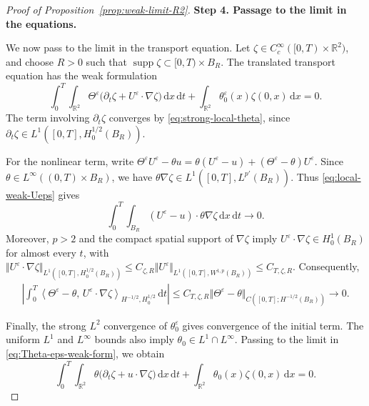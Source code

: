 \documentclass[reqno,11pt,a4paper]{amsart}
\newcommand{\dd}{\mathrm{d}}
\begin{document}
\begin{proof}[Proof of Proposition~\ref{prop:weak-limit-R2}]
\medskip
\noindent\textbf{Step 4. Passage to the limit in the equations.}



We now pass to the limit in the transport equation.
Let $\zeta\in C_c^\infty([0,T)\times\mathbb R^2)$,
and choose $R>0$ such that
$\operatorname{supp}\zeta\subset[0,T)\times B_R$.
The translated transport equation has the weak formulation
\begin{equation}\label{eq:Theta-eps-weak-form}
  \int_0^T\!\int_{\mathbb R^2}
    \Theta^\varepsilon
    \bigl(\partial_t\zeta
      +U^\varepsilon\cdot\nabla\zeta\bigr)
    \,\dd x\,\dd t
  +\int_{\mathbb R^2}
    \theta_0^\varepsilon(x)\zeta(0,x)\,\dd x
  =0.
\end{equation}
The term involving $\partial_t\zeta$ converges by
\eqref{eq:strong-local-theta}, since
$\partial_t\zeta\in L^1([0,T],H_0^{1/2}(B_R))$.

For the nonlinear term, write $\Theta^\varepsilon U^\varepsilon-\theta u
  =
  \theta(U^\varepsilon-u)
  +(\Theta^\varepsilon-\theta)U^\varepsilon$. Since $\theta\in L^\infty((0,T)\times B_R)$,
we have
$\theta\nabla\zeta\in L^1([0,T],L^{p'}(B_R))$.
Thus \eqref{eq:local-weak-Ueps} gives
\[
  \int_0^T\!\int_{B_R}
    (U^\varepsilon-u)\cdot\theta\nabla\zeta
    \,\dd x\,\dd t
  \longrightarrow0.
\]
Moreover, $p>2$ and the compact spatial support
of $\nabla\zeta$ imply
$U^\varepsilon\cdot\nabla\zeta\in H_0^1(B_R)$
for almost every $t$, with
$\Vert U^\varepsilon\cdot\nabla\zeta
    \Vert _{L^1([0,T],H_0^{1/2}(B_R))}
  \leq
  C_{\zeta,R}
  \Vert U^\varepsilon\Vert _{L^1([0,T],W^{1,p}(B_R))}
  \leq C_{T,\zeta,R}$.
Consequently,
\begin{align*}
  \left|
    \int_0^T
    \left\langle
      \Theta^\varepsilon-\theta,\,
      U^\varepsilon\cdot\nabla\zeta
    \right\rangle_{H^{-1/2},H_0^{1/2}}
    \,\dd t
  \right|
  \leq
  C_{T,\zeta,R}
  \Vert \Theta^\varepsilon-\theta
    \Vert _{C([0,T];H^{-1/2}(B_R))}
  \longrightarrow0.
\end{align*}

Finally, the strong $L^2$ convergence of
$\theta_0^\varepsilon$ gives convergence of the initial term.
The uniform $L^1$ and $L^\infty$ bounds also imply
$\theta_0\in L^1\cap L^\infty$.
Passing to the limit in
\eqref{eq:Theta-eps-weak-form}, we obtain
\[
  \int_0^T\!\int_{\mathbb R^2}
    \theta\bigl(\partial_t\zeta+u\cdot\nabla\zeta\bigr)
    \,\dd x\,\dd t
  +\int_{\mathbb R^2}\theta_0(x)\zeta(0,x)\,\dd x
  =0.
\]


\end{proof}
\end{document}
